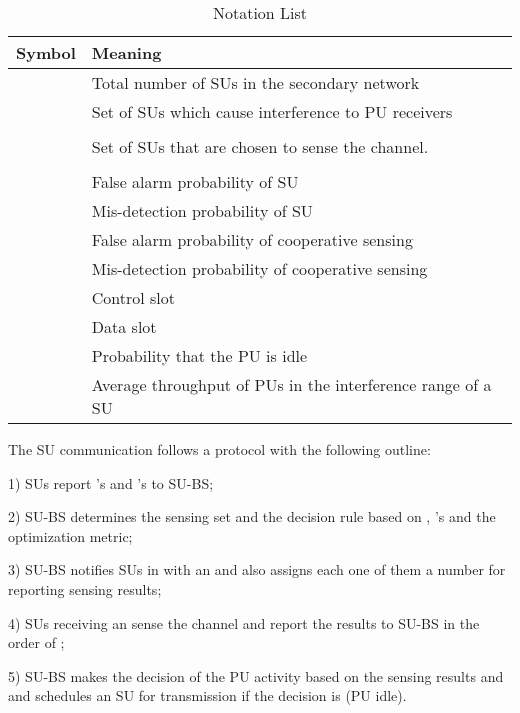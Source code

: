 \documentclass[conference]{IEEEtran}
\begin{document}
\begin{table}[t]
\centering
\caption{{\scriptsize Notation List}}
\vspace{-1em}
\begin{tabular}{|c|l|}
\hline
{\scriptsize Symbol}&{\footnotesize Meaning}\\\hline\hline
{\scriptsize }&{\scriptsize Total number of SUs in the secondary network}\\\hline
{\scriptsize }&{\scriptsize Set of SUs which cause interference to PU receivers}\\\hline
{\scriptsize }&{\scriptsize }\\\hline
{\scriptsize }&{\scriptsize Set of SUs that are chosen to sense the channel. }\\\hline
{\scriptsize }&{\scriptsize }\\\hline
{\scriptsize }&{\scriptsize False alarm probability of SU }\\\hline
{\scriptsize }&{\scriptsize Mis-detection probability of SU }\\\hline
{\scriptsize }&{\scriptsize False alarm probability of cooperative sensing}\\\hline
{\scriptsize }&{\scriptsize Mis-detection probability of cooperative sensing}\\\hline
{\scriptsize }&{\scriptsize Control slot}\\\hline
{\scriptsize }&{\scriptsize Data slot}\\\hline
{\scriptsize }&{\scriptsize Probability that the PU is idle}\\\hline
{\scriptsize }&{\scriptsize Average throughput of PUs in the interference range of a SU}\\\hline
\end{tabular}
\label{tab:not}
\vspace{-1em}
\end{table}

The SU communication follows a protocol with the following outline:

1) SUs report 's and 's to SU-BS;

2) SU-BS determines the sensing set  and the decision rule  based on , 's and the optimization metric;

3) SU-BS notifies SUs in  with an  and also assigns each one of them a  number for reporting sensing results;

4) SUs receiving an  sense the channel and report the results to SU-BS in the order of ;

5) SU-BS makes the decision of the PU activity based on the sensing results and  and schedules an SU for transmission if the decision is  (PU idle).
\end{document}
